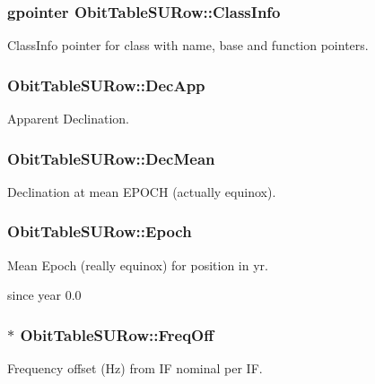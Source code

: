 \subsubsection{\setlength{\rightskip}{0pt plus 5cm}gpointer {\bf Obit\-Table\-SURow::Class\-Info}}\label{structObitTableSURow_o1}


Class\-Info pointer for class with name, base and function pointers. 

\subsubsection{ {\bf Obit\-Table\-SURow::Dec\-App}}\label{structObitTableSURow_o13}


Apparent Declination. 

\subsubsection{ {\bf Obit\-Table\-SURow::Dec\-Mean}}\label{structObitTableSURow_o10}


Declination at mean EPOCH (actually equinox). 

\subsubsection{ {\bf Obit\-Table\-SURow::Epoch}}\label{structObitTableSURow_o11}


Mean Epoch (really equinox) for position in yr. 

since year 0.0 
\subsubsection{$\ast$ {\bf Obit\-Table\-SURow::Freq\-Off}}\label{structObitTableSURow_o22}


Frequency offset (Hz) from IF nominal per IF. 

